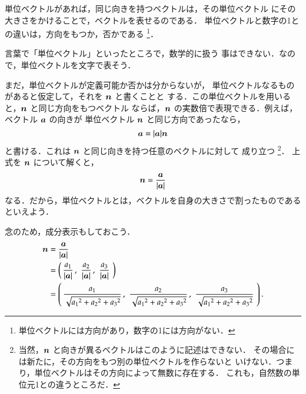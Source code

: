                 単位ベクトルがあれば，同じ向きを持つベクトルは，その単位ベクトル
                にその大きさをかけることで，ベクトルを表せるのである．
                単位ベクトルと数字の1との違いは，方向をもつか，否かである
                    \footnote{
                        単位ベクトルには方向があり，数字の1には方向がない．
                    }．

                言葉で「単位ベクトル」といったところで，数学的に扱う
                事はできない．なので，単位ベクトルを文字で表そう．

                まだ，単位ベクトルが定義可能か否かは分からないが，
                単位ベクトルなるものがあると仮定して，それを $\boldsymbol{n}$ と書くことと
                する．この単位ベクトルを用いると，$\boldsymbol{n}$ と同じ方向をもつベクトル
                ならば，$\boldsymbol{n}$ の実数倍で表現できる．例えば，ベクトル $\boldsymbol{a}$ の向きが
                単位ベクトル $\boldsymbol{n}$ と同じ方向であったなら，
                    \begin{equation*}
                        \boldsymbol{a} = | \boldsymbol{a} | \boldsymbol{n}
                    \end{equation*}
                と書ける．これは $\boldsymbol{n}$ と同じ向きを持つ任意のベクトルに対して
                成り立つ
                    \footnote{
                        当然，$\boldsymbol{n}$ と向きが異るベクトルはこのように記述はできない．
                        その場合には新たに，その方向をもつ別の単位ベクトルを作らないと
                        いけない．つまり，単位ベクトルはその方向によって無数に存在する．
                        これも，自然数の単位元1との違うところだ．
                    }．
                上式を $\boldsymbol{n}$ について解くと，
                    \begin{align}
                        \boldsymbol{n} = \frac{\boldsymbol{a}}{|\boldsymbol{a}|}
                    \end{align}
                なる．だから，単位ベクトルとは，ベクトルを自身の大きさで割ったものである
                といえよう．

                念のため，成分表示もしておこう．
                    \begin{align*}
                        \boldsymbol{n} &= \frac{\boldsymbol{a}}{|\boldsymbol{a}|} \\
                            &= \left(
                                    \,\frac{a_{1}}{|\boldsymbol{a}|}\,,\,
                                    \,\frac{a_{2}}{|\boldsymbol{a}|}\,,\,
                                    \,\frac{a_{3}}{|\boldsymbol{a}|}\,\,
                               \right) \\
                            &= \left(
                                    \,\frac{a_{1}}{\sqrt{{a_{1}}^{2}+{a_{2}}^{2}+{a_{3}}^{2}}}\,,\,
                                    \,\frac{a_{2}}{\sqrt{{a_{1}}^{2}+{a_{2}}^{2}+{a_{3}}^{2}}}\,,\,
                                    \,\frac{a_{3}}{\sqrt{{a_{1}}^{2}+{a_{2}}^{2}+{a_{3}}^{2}}}\,\,
                               \right).
                    \end{align*}

